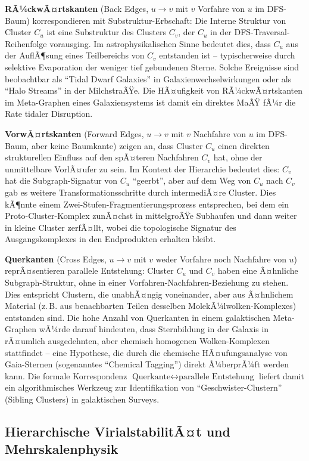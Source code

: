 ﻿\documentclass[a4paper,12pt]{report}
\theoremstyle{definition}
\begin{document}
\textbf{RÃ¼ckwÃ¤rtskanten} (Back Edges, $u \to v$ mit $v$ Vorfahre von $u$ im DFS-Baum) korrespondieren mit Substruktur-Erbschaft: Die Interne Struktur von Cluster $C_u$ ist eine Substruktur des Clusters $C_v$, der $C_u$ in der DFS-Traversal-Reihenfolge vorausging. Im astrophysikalischen Sinne bedeutet dies, dass $C_u$ aus der AuflÃ¶sung eines Teilbereichs von $C_v$ entstanden ist -- typischerweise durch selektive Evaporation der weniger tief gebundenen Sterne. Solche Ereignisse sind beobachtbar als ``Tidal Dwarf Galaxies'' in Galaxienwechselwirkungen oder als ``Halo Streams'' in der MilchstraÃŸe. Die HÃ¤ufigkeit von RÃ¼ckwÃ¤rtskanten im Meta-Graphen eines Galaxiensystems ist damit ein direktes MaÃŸ fÃ¼r die Rate tidaler Disruption.

\textbf{VorwÃ¤rtskanten} (Forward Edges, $u \to v$ mit $v$ Nachfahre von $u$ im DFS-Baum, aber keine Baumkante) zeigen an, dass Cluster $C_u$ einen direkten strukturellen Einfluss auf den spÃ¤teren Nachfahren $C_v$ hat, ohne der unmittelbare VorlÃ¤ufer zu sein. Im Kontext der Hierarchie bedeutet dies: $C_v$ hat die Subgraph-Signatur von $C_u$ ``geerbt'', aber auf dem Weg von $C_u$ nach $C_v$ gab es weitere Transformationsschritte durch intermediÃ¤re Cluster. Dies kÃ¶nnte einem Zwei-Stufen-Fragmentierungsprozess entsprechen, bei dem ein Proto-Cluster-Komplex zunÃ¤chst in mittelgroÃŸe Subhaufen und dann weiter in kleine Cluster zerfÃ¤llt, wobei die topologische Signatur des Ausgangskomplexes in den Endprodukten erhalten bleibt.

\textbf{Querkanten} (Cross Edges, $u \to v$ mit $v$ weder Vorfahre noch Nachfahre von $u$) reprÃ¤sentieren parallele Entstehung: Cluster $C_u$ und $C_v$ haben eine Ã¤hnliche Subgraph-Struktur, ohne in einer Vorfahren-Nachfahren-Beziehung zu stehen. Dies entspricht Clustern, die unabhÃ¤ngig voneinander, aber aus Ã¤hnlichem Material (z.\,B. aus benachbarten Teilen desselben MolekÃ¼lwolken-Komplexes) entstanden sind. Die hohe Anzahl von Querkanten in einem galaktischen Meta-Graphen wÃ¼rde darauf hindeuten, dass Sternbildung in der Galaxis in rÃ¤umlich ausgedehnten, aber chemisch homogenen Wolken-Komplexen stattfindet -- eine Hypothese, die durch die chemische HÃ¤ufungsanalyse von Gaia-Sternen (sogenanntes ``Chemical Tagging'') direkt Ã¼berprÃ¼ft werden kann. Die formale Korrespondenz $\text{Querkante} \leftrightarrow \text{parallele Entstehung}$ liefert damit ein algorithmisches Werkzeug zur Identifikation von ``Geschwister-Clustern'' (Sibling Clusters) in galaktischen Surveys.

\subsection{Hierarchische VirialstabilitÃ¤t und Mehrskalenphysik}
\end{document}
